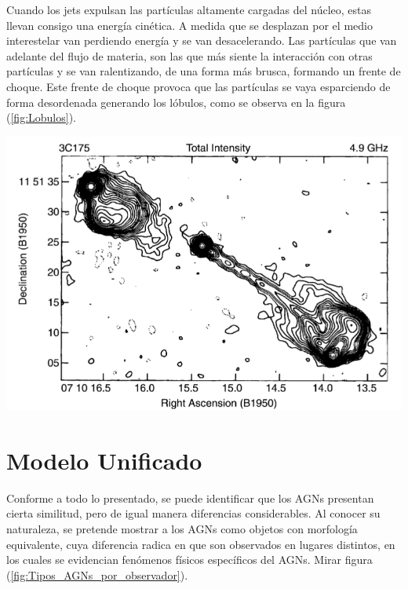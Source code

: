 Cuando los jets expulsan las partículas altamente cargadas del núcleo, estas llevan consigo una energía cinética. A medida que se desplazan por el medio interestelar van perdiendo energía y se van desacelerando. Las partículas que van adelante del flujo de materia, son las que más siente la interacción con otras partículas y se van ralentizando, de una forma más brusca, formando un frente de choque. Este frente de choque provoca que las partículas se vaya esparciendo  de forma desordenada generando los lóbulos, como se observa en la figura (\ref{fig:Lobulos}).

\begin{center}
\includegraphics[scale=.3]{./figures/3_AGNs/Lobulos_y_Jets.png}
\label{fig:Lobulos}
\end{center}

\section{Modelo Unificado}
\label{sec:Unified_models}

Conforme a todo lo presentado, se puede identificar que los AGNs presentan cierta similitud, pero de igual manera diferencias considerables. Al conocer su naturaleza, se pretende mostrar a los AGNs como objetos con morfología equivalente, cuya diferencia radica en que son observados en lugares distintos, en los cuales se evidencian fenómenos físicos específicos del AGNs. Mirar figura (\ref{fig:Tipos_AGNs_por_observador}).

